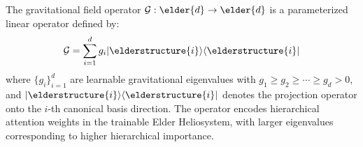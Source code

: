 \begin{definition}
The gravitational field operator $\mathcal{G}: \elder{d} \rightarrow \elder{d}$ is a parameterized linear operator defined by:
\begin{equation}
\mathcal{G} = \sum_{i=1}^{d} g_i |\elderstructure{i}\rangle\langle\elderstructure{i}|
\end{equation}
where $\{g_i\}_{i=1}^{d}$ are learnable gravitational eigenvalues with $g_1 \geq g_2 \geq \cdots \geq g_d > 0$, and $|\elderstructure{i}\rangle\langle\elderstructure{i}|$ denotes the projection operator onto the $i$-th canonical basis direction. The operator encodes hierarchical attention weights in the trainable Elder Heliosystem, with larger eigenvalues corresponding to higher hierarchical importance.
\end{definition}

